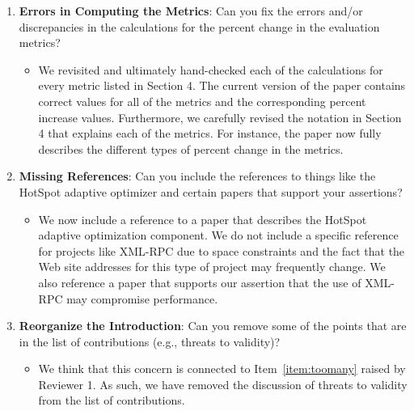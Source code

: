 \documentclass[11pt]{article}
\begin{document}
\begin{enumerate}
\begin{itemize}
    \end{itemize}

  \item {\bf Errors in Computing the Metrics}: Can you fix the errors
    and/or discrepancies in the calculations for the percent change in
    the evaluation metrics?

    \begin{itemize}
      
      \item We revisited and ultimately hand-checked each of the
        calculations for every metric listed in Section 4.  The
        current version of the paper contains correct values for all
        of the metrics and the corresponding percent increase values.
        Furthermore, we carefully revised the notation in Section 4
        that explains each of the metrics.  For instance, the paper
        now fully describes the different types of percent change in
        the metrics.


    \end{itemize}

  \item {\bf Missing References}: Can you include the references to
    things like the HotSpot adaptive optimizer and certain papers that
    support your assertions?

    \begin{itemize}
      
      \item We now include a reference to a paper that describes the
        HotSpot adaptive optimization component. We do not include a
        specific reference for projects like XML-RPC due to space
        constraints and the fact that the Web site addresses for this
        type of project may frequently change.  We also reference a
        paper that supports our assertion that the use of XML-RPC may
        compromise performance.

    \end{itemize}

\newpage

  \item {\bf Reorganize the Introduction}: Can you remove some of the
    points that are in the list of contributions (e.g., threats to
    validity)?

    \begin{itemize}
      
      \item We think that this concern is connected to
        Item~\ref{item:toomany} raised by Reviewer 1.  As such, we
        have removed the discussion of threats to validity from the
        list of contributions.


\end{itemize}
\end{enumerate}
\end{document}
